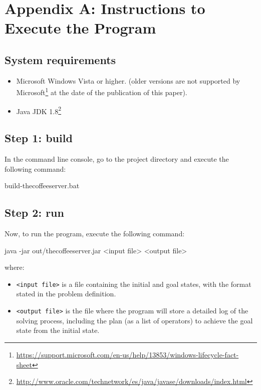 \documentclass[12pt,a4paper,oneside]{article}
\numberwithin{equation}{section}
\numberwithin{equation}{section}
\theoremstyle{definition}
\begin{document}
\newpage

\section*{Appendix A: Instructions to Execute the Program} \label{Instructions to Execute the Program}


\subsection*{System requirements}
\begin{itemize}
	\item Microsoft Windows Vista or higher. (older versions are not supported by Microsoft\footnote{\url{https://support.microsoft.com/en-us/help/13853/windows-lifecycle-fact-sheet}} at the date of the publication of this paper).
	\item Java JDK 1.8\footnote{\url{http://www.oracle.com/technetwork/es/java/javase/downloads/index.html}}
\end{itemize}

\subsection*{Step 1: build}
In the command line console, go to the project directory and execute the following command:

\begin{listing}[style=consola, numbers=none]
build-thecoffeeserver.bat
\end{listing}

\subsection*{Step 2: run}
Now, to run the program, execute the following command:

\begin{listing}[style=consola, numbers=none]
java -jar out/thecoffeeserver.jar <input file> <output file>
\end{listing}
where:
\begin{itemize}
	\item \texttt{<input file>} is a file containing the initial and goal states, with the format stated in the problem definition.
	\item \texttt{<output file>} is the file where the program will store a detailed log of the solving process, including the plan (as a list of operators) to achieve the goal state from the initial state.
\end{itemize}
\end{document}
